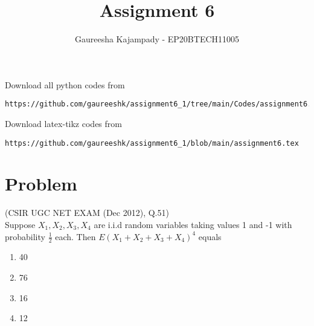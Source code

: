 \documentclass[journal,12pt,twocolumn]{IEEEtran}
\begin{document}
\def\putbox#1#2#3{\makebox[0in][l]{\makebox[#1][l]{}\raisebox{\baselineskip}[0in][0in]{\raisebox{#2}[0in][0in]{#3}}}}
     \def\rightbox#1{\makebox[0in][r]{#1}}  
     \def\centbox#1{\makebox[0in]{#1}}
     \def\topbox#1{\raisebox{-\baselineskip}[0in][0in]{#1}}
     \def\midbox#1{\raisebox{-0.5\baselineskip}[0in][0in]{#1}}
\vspace{3cm}
\title{Assignment 6}
\author{Gaureesha Kajampady - EP20BTECH11005}
\maketitle  
\newpage
\bigskips
\renewcommand{\thefigure}{\theenumi}
\renewcommand{\thetable}{\theenumi}
Download all python codes from 
\begin{lstlisting}
https://github.com/gaureeshk/assignment6_1/tree/main/Codes/assignment6.py
\end{lstlisting}
%
Download latex-tikz codes from 
%
\begin{lstlisting}
https://github.com/gaureeshk/assignment6_1/blob/main/assignment6.tex
\end{lstlisting}
\section{Problem}
(CSIR UGC NET EXAM (Dec 2012), Q.51)\\
Suppose $X_{1}, X_{2}, X_{3}, X_{4}$ are i.i.d random variables taking values 1 and -1 with probability $\frac{1}{2}$ each. Then $E(X_{1}+X_{2}+X_{3}+X_{4})^{4}$ equals
\begin{enumerate}
    \item{40}\\
    \item{76}\\
     \item{16}\\
      \item{12}\\
\end{enumerate}
\end{document}
